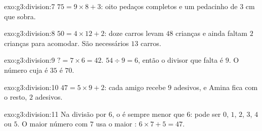 \begin{solution}{exo:g3:division:7}
$75 = 9 \times 8 + 3$: oito pedaços completos e um pedacinho de
$3$ cm que sobra.
\end{solution}

\begin{solution}{exo:g3:division:8}
$50 = 4 \times 12 + 2$: doze carros levam $48$ crianças e ainda
faltam $2$ crianças para acomodar. São necessários $13$ carros.
\end{solution}

\begin{solution}{exo:g3:division:9}
$? = 7 \times 6 = 42$. \quad
$54 \div 9 = 6$, então o divisor que falta é $9$. \quad
O número cuja  é $35$ é $70$.
\end{solution}

\begin{solution}{exo:g3:division:10}
$47 = 5 \times 9 + 2$: cada amigo recebe $9$ adesivos, e Amina fica
com o resto, $2$ adesivos.
\end{solution}

\begin{solution}{exo:g3:division:11}
Na divisão por $6$, o  é sempre menor que $6$: pode ser $0$,
$1$, $2$, $3$, $4$ ou $5$. O maior número com  $7$ usa o
maior : $6 \times 7 + 5 = 47$.
\end{solution}
